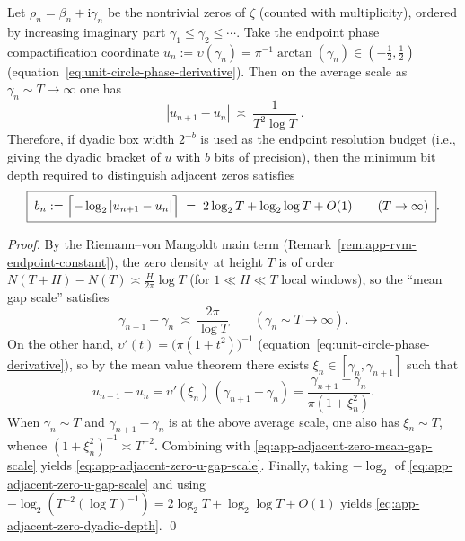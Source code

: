 \begin{proposition}\label{prop:app-adjacent-zero-dyadic-resolution}
Let \(\rho_n=\beta_n+\mathrm{i}\gamma_n\) be the nontrivial zeros of \(\zeta\) (counted with multiplicity), ordered by increasing imaginary part \(\gamma_1\le \gamma_2\le\cdots\).
Take the endpoint phase compactification coordinate
\(
u_n:=\upsilon(\gamma_n)=\pi^{-1}\arctan(\gamma_n)\in(-\tfrac12,\tfrac12)
\)
(equation~\eqref{eq:unit-circle-phase-derivative}).
Then on the average scale as \(\gamma_n\sim T\to\infty\) one has
\begin{equation}\label{eq:app-adjacent-zero-u-gap-scale}
\boxed{\;
|u_{n+1}-u_n|\ \asymp\ \frac{1}{T^{2}\log T}\; }.
\end{equation}
Therefore, if dyadic box width \(2^{-b}\) is used as the endpoint resolution budget (i.e., giving the dyadic bracket of \(u\) with \(b\) bits of precision), then the minimum bit depth required to distinguish adjacent zeros satisfies
\begin{equation}\label{eq:app-adjacent-zero-dyadic-depth}
\boxed{\;
b_{n}:=\Bigl\lceil-\log_{2}|u_{n+1}-u_n|\Bigr\rceil
\;=\;2\log_{2}T+\log_{2}\log T+O(1)\qquad(T\to\infty)\; }.
\end{equation}
\end{proposition}

\begin{proof}
By the Riemann--von Mangoldt main term (Remark~\ref{rem:app-rvm-endpoint-constant}), the zero density at height \(T\) is of order
\(
N(T+H)-N(T)\asymp \frac{H}{2\pi}\log T
\)
(for \(1\ll H\ll T\) local windows), so the ``mean gap scale'' satisfies
\begin{equation}\label{eq:app-adjacent-zero-mean-gap-scale}
\gamma_{n+1}-\gamma_n\ \asymp\ \frac{2\pi}{\log T}
\qquad(\gamma_n\sim T\to\infty).
\end{equation}
On the other hand, \(\upsilon'(t)=\bigl(\pi(1+t^2)\bigr)^{-1}\) (equation~\eqref{eq:unit-circle-phase-derivative}), so by the mean value theorem there exists \(\xi_n\in[\gamma_n,\gamma_{n+1}]\) such that
\[
u_{n+1}-u_n=\upsilon'(\xi_n)\,(\gamma_{n+1}-\gamma_n)
=\frac{\gamma_{n+1}-\gamma_n}{\pi(1+\xi_n^{2})}.
\]
When \(\gamma_n\sim T\) and \(\gamma_{n+1}-\gamma_n\) is at the above average scale, one also has \(\xi_n\sim T\), whence \((1+\xi_n^2)^{-1}\asymp T^{-2}\).
Combining with \eqref{eq:app-adjacent-zero-mean-gap-scale} yields \eqref{eq:app-adjacent-zero-u-gap-scale}.
Finally, taking \(-\log_2\) of \eqref{eq:app-adjacent-zero-u-gap-scale} and using \(-\log_2(T^{-2}(\log T)^{-1})=2\log_2 T+\log_2\log T+O(1)\) yields \eqref{eq:app-adjacent-zero-dyadic-depth}. \qed
\end{proof}
